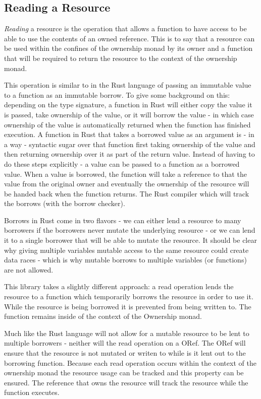 \documentclass[onehalf,11pt]{beavtex}
\begin{document}
\subsection{Reading a Resource}

\textit{Reading} a resource is the operation that allows a function to have
access to be able to use the contents of an owned reference.
This is to say that a resource can be used within the confines of the ownership
monad by its owner and a function that will be required to return the resource
to the context of the ownership monad.

This operation is similar to in the Rust language of passing an immutable value to
a function as an immutable borrow. %
To give some background on this: depending on the type signature, a function in
Rust will either copy the value it is passed, take ownership of the value, or it
will borrow the value - in which case ownership of the value is automatically
returned when the function has finished execution.\cite{rust_book_ownership}
A function in Rust that takes a borrowed value as an argument is - in a way -
syntactic sugar over that function first taking ownership of the value and then
returning ownership over it as part of the return value.
Instead of having to do these steps explicitly - a value can be passed to a
function as a borrowed value.  When a value is borrowed, the function will take
a reference to that the value from the original owner and eventually the
ownership of the resource will be handed back when the function returns.
The Rust compiler which will track the borrows (with the borrow checker).

Borrows in Rust come in two flavors - we can either lend a resource to many
borrowers if the borrowers never mutate the underlying resource - or we can
lend it to a single borrower that will be able to mutate the
resource.\cite{rust_book_borrowing}
It should be clear why giving multiple variables mutable access to
the same resource could create data races - which is why mutable borrows to
multiple variables (or functions) are not allowed.

This library takes a slightly different approach: a read operation
lends the resource to a function which temporarily borrows the resource
in order to use it. While the resource is being borrowed it is prevented
from being written to. The function remains inside of the context of the
Ownership monad.

Much like the Rust language will not allow for a mutable resource to be lent to
multiple borrowers - neither will the read operation on a ORef.
The ORef will ensure that the resource is not mutated or writen to while is it
lent out to the borrowing function. 
Because each read operation occurs within the context of the ownership monad the
resource usage can be tracked and this property can be ensured.
The reference that owns the resource will track the resource while the 
function executes.
\end{document}
